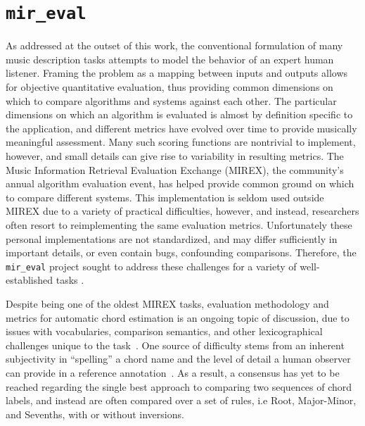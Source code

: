 \section{\texttt{mir\_eval}}
\label{sec:mir_eval}

As addressed at the outset of this work, the conventional formulation of many music description tasks attempts to model the behavior of an expert human listener.
Framing the problem as a mapping between inputs and outputs allows for objective quantitative evaluation, thus providing common dimensions on which to compare algorithms and systems against each other.
The particular dimensions on which an algorithm is evaluated is almost by definition specific to the application, and different metrics have evolved over time to provide musically meaningful assessment.
Many such scoring functions are nontrivial to implement, however, and small details can give rise to variability in resulting metrics.
The Music Information Retrieval Evaluation Exchange (MIREX), the community's annual algorithm evaluation event, has helped provide common ground on which to compare different systems.
This implementation is seldom used outside MIREX due to a variety of practical difficulties, however, and instead, researchers often resort to reimplementing the same evaluation metrics.
Unfortunately these personal implementations are not standardized, and may differ sufficiently in important details, or even contain bugs, confounding comparisons.
Therefore, the \texttt{mir\_eval} project sought to address these challenges for a variety of well-established tasks \cite{Raffel2014}.

Despite being one of the oldest MIREX tasks, evaluation methodology and metrics for automatic chord estimation is an ongoing topic of discussion, due to issues with vocabularies, comparison semantics, and other lexicographical challenges unique to the task~\cite{pauwels2013evaluating}.
One source of difficulty stems from an inherent subjectivity in ``spelling'' a chord name and the level of detail a human observer can provide in a reference annotation~\cite{ni2013understanding}.
As a result, a consensus has yet to be reached regarding the single best approach to comparing two sequences of chord labels, and instead are often compared over a set of rules, i.e Root, Major-Minor, and Sevenths, with or without inversions.

